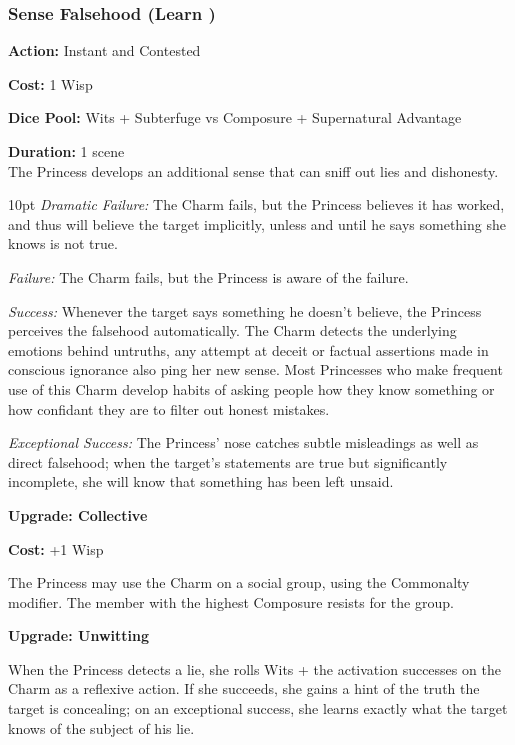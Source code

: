 \subsubsection*{Sense Falsehood (Learn \textbullet)}

\noindent \textbf{Action:} Instant and Contested

\noindent \textbf{Cost:} 1 Wisp

\noindent \textbf{Dice Pool:}  Wits + Subterfuge vs Composure + Supernatural Advantage

\noindent \textbf{Duration:} 1 scene \\

\noindent The Princess develops an additional sense that can sniff out lies and dishonesty.

\begin{myindentpar}{10pt}    \emph{Dramatic Failure:} The Charm fails, but the Princess believes it has worked, and thus will believe the target implicitly, unless and until he says something she knows is not true.

    \emph{Failure:} The Charm fails, but the Princess is aware of the failure.

    \emph{Success:} Whenever the target says something he doesn't believe, the Princess perceives the falsehood automatically. The Charm detects the underlying emotions behind untruths, any attempt at deceit or factual assertions made in conscious ignorance also ping her new sense. Most Princesses who make frequent use of this Charm develop habits of asking people how they know something or how confidant they are to filter out honest mistakes. 

    \emph{Exceptional Success:} The Princess' nose catches subtle misleadings as well as direct falsehood; when the target's statements are true but significantly incomplete, she will know that something has been left unsaid.

\textbf{Upgrade: Collective}

\noindent \textbf{Cost:} +1 Wisp

The Princess may use the Charm on a social group, using the Commonalty modifier. The member with the highest Composure resists for the group.

\textbf{Upgrade: Unwitting}

When the Princess detects a lie, she rolls Wits + the activation successes on the Charm as a reflexive action. If she succeeds, she gains a hint of the truth the target is concealing; on an exceptional success, she learns exactly what the target knows of the subject of his lie.


\end{myindentpar}
